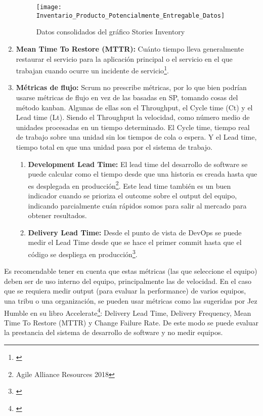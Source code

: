 \begin{enumerate}
  \begin{figure}[h]
  \centering
  \texttt{[image: Inventario\_Producto\_Potencialmente\_Entregable\_Datos]}
  \caption{Datos consolidados del gráfico Stories Inventory}
  \centering
  \label{fig:Inventario_Producto_Potencialmente_Entregable_Datos} %
  \end{figure}
  \FloatBarrier

\item {\textbf{Mean Time To Restore (MTTR):} Cuánto tiempo lleva generalmente restaurar el servicio para la aplicación principal o el servicio en el que trabajan cuando ocurre un incidente de servicio\footnote{\cite{Humble-2018}}.
}

\item {\textbf{Métricas de flujo:} Scrum no prescribe métricas, por lo que bien podrían usarse métricas de flujo en vez de las basadas en SP, tomando cosas del método kanban. Algunas de ellas son el Throughput, el Cycle time (Ct) y el Lead time (Lt). Siendo el Throughput la velocidad, como número medio de unidades procesadas en un tiempo determinado. El Cycle time, tiempo real de trabajo sobre una unidad sin los tiempos de cola o espera. Y el Lead time, tiempo total en que una unidad pasa por el sistema de trabajo. 

\begin{enumerate}    
    \item {\textbf{Development Lead Time:} El lead time del desarrollo de software se puede calcular como el tiempo desde que una historia es creada hasta que es desplegada en producción\footnote{Agile Alliance Resources 2018}.  Este lead time también es un buen indicador cuando se prioriza el outcome sobre el output del equipo, indicando parcialmente cuán rápidos somos para salir al mercado para obtener resultados.
}
 \item {\textbf{Delivery Lead Time:} Desde el punto de vista de DevOps se puede medir el Lead Time desde que se hace el primer commit hasta que el código se despliega en producción\footnote{\cite{Humble-2018}}.
}
\end{enumerate}

}

\end{enumerate}

Es recomendable tener en cuenta que estas métricas (las que seleccione el equipo) deben ser de uso interno del equipo, principalmente las de velocidad. En el caso que se requiera medir output (para evaluar la performance) de varios equipos, una tribu o una organización, se pueden usar métricas como las sugeridas por Jez Humble en su libro Accelerate\footnote{\cite{Humble-2018}}: Delivery Lead Time, Delivery Frequency, Mean Time To Restore (MTTR) y Change Failure Rate. De este modo se puede evaluar la prestancia del sistema de desarrollo de software y no medir equipos.

